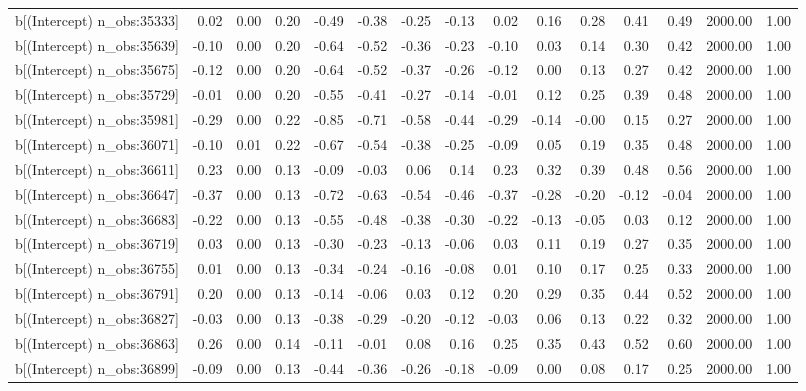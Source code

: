 \begin{table}[ht]
\begin{tabular}{rrrrrrrrrrrrrrr}
  b[(Intercept) n\_obs:35333] & 0.02 & 0.00 & 0.20 & -0.49 & -0.38 & -0.25 & -0.13 & 0.02 & 0.16 & 0.28 & 0.41 & 0.49 & 2000.00 & 1.00 \\ 
  b[(Intercept) n\_obs:35639] & -0.10 & 0.00 & 0.20 & -0.64 & -0.52 & -0.36 & -0.23 & -0.10 & 0.03 & 0.14 & 0.30 & 0.42 & 2000.00 & 1.00 \\ 
  b[(Intercept) n\_obs:35675] & -0.12 & 0.00 & 0.20 & -0.64 & -0.52 & -0.37 & -0.26 & -0.12 & 0.00 & 0.13 & 0.27 & 0.42 & 2000.00 & 1.00 \\ 
  b[(Intercept) n\_obs:35729] & -0.01 & 0.00 & 0.20 & -0.55 & -0.41 & -0.27 & -0.14 & -0.01 & 0.12 & 0.25 & 0.39 & 0.48 & 2000.00 & 1.00 \\ 
  b[(Intercept) n\_obs:35981] & -0.29 & 0.00 & 0.22 & -0.85 & -0.71 & -0.58 & -0.44 & -0.29 & -0.14 & -0.00 & 0.15 & 0.27 & 2000.00 & 1.00 \\ 
  b[(Intercept) n\_obs:36071] & -0.10 & 0.01 & 0.22 & -0.67 & -0.54 & -0.38 & -0.25 & -0.09 & 0.05 & 0.19 & 0.35 & 0.48 & 2000.00 & 1.00 \\ 
  b[(Intercept) n\_obs:36611] & 0.23 & 0.00 & 0.13 & -0.09 & -0.03 & 0.06 & 0.14 & 0.23 & 0.32 & 0.39 & 0.48 & 0.56 & 2000.00 & 1.00 \\ 
  b[(Intercept) n\_obs:36647] & -0.37 & 0.00 & 0.13 & -0.72 & -0.63 & -0.54 & -0.46 & -0.37 & -0.28 & -0.20 & -0.12 & -0.04 & 2000.00 & 1.00 \\ 
  b[(Intercept) n\_obs:36683] & -0.22 & 0.00 & 0.13 & -0.55 & -0.48 & -0.38 & -0.30 & -0.22 & -0.13 & -0.05 & 0.03 & 0.12 & 2000.00 & 1.00 \\ 
  b[(Intercept) n\_obs:36719] & 0.03 & 0.00 & 0.13 & -0.30 & -0.23 & -0.13 & -0.06 & 0.03 & 0.11 & 0.19 & 0.27 & 0.35 & 2000.00 & 1.00 \\ 
  b[(Intercept) n\_obs:36755] & 0.01 & 0.00 & 0.13 & -0.34 & -0.24 & -0.16 & -0.08 & 0.01 & 0.10 & 0.17 & 0.25 & 0.33 & 2000.00 & 1.00 \\ 
  b[(Intercept) n\_obs:36791] & 0.20 & 0.00 & 0.13 & -0.14 & -0.06 & 0.03 & 0.12 & 0.20 & 0.29 & 0.35 & 0.44 & 0.52 & 2000.00 & 1.00 \\ 
  b[(Intercept) n\_obs:36827] & -0.03 & 0.00 & 0.13 & -0.38 & -0.29 & -0.20 & -0.12 & -0.03 & 0.06 & 0.13 & 0.22 & 0.32 & 2000.00 & 1.00 \\ 
  b[(Intercept) n\_obs:36863] & 0.26 & 0.00 & 0.14 & -0.11 & -0.01 & 0.08 & 0.16 & 0.25 & 0.35 & 0.43 & 0.52 & 0.60 & 2000.00 & 1.00 \\ 
  b[(Intercept) n\_obs:36899] & -0.09 & 0.00 & 0.13 & -0.44 & -0.36 & -0.26 & -0.18 & -0.09 & 0.00 & 0.08 & 0.17 & 0.25 & 2000.00 & 1.00 \\ 

\end{tabular}
\end{table}
